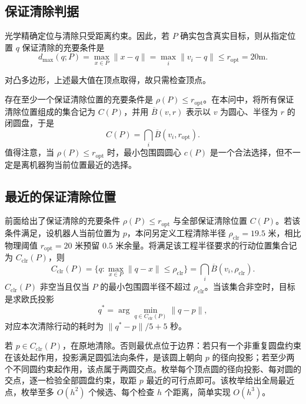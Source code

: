 \documentclass[UTF8,a4paper,zihao=-4,fontset=none]{ctexart}
\begin{document}
\subsection{保证清除判据}

光学精确定位与清除只受距离约束。因此，若 \(P\) 确实包含真实目标，则从指定位置 \(q\) 保证清除的充要条件是
\begin{equation}
  d_{\max}(q;P)=\max_{x\in P}\lVert x-q\rVert=\max_i\lVert v_i-q\rVert\le r_{\mathrm{opt}} =20\mathrm{m}.
  \label{eq:clear-condition}
\end{equation}

对凸多边形，上述最大值在顶点取得，故只需检查顶点。

存在至少一个保证清除位置的充要条件是 \(\rho(P)\le r_{\mathrm{opt}}\)。在本问中，将所有保证清除位置组成的集合记为 \(C(P)\)，并用 \(\overline B(v,r)\) 表示以 \(v\) 为圆心、半径为 \(r\) 的闭圆盘，于是
\begin{equation}
  C(P)=\bigcap_i\overline{B}(v_i,r_{\mathrm{opt}}).
  \label{eq:clear-set}
\end{equation}
值得注意，当 \(\rho(P)\le r_{\mathrm{opt}}\) 时，最小包围圆圆心 \(c(P)\) 是一个合法选择，但不一定是离机器狗当前位置最近的选择。

\subsection{最近的保证清除位置}

前面给出了保证清除的充要条件 \(\rho(P)\le r_{\mathrm{opt}}\) 与全部保证清除位置 \(C(P)\)。若该条件满足，设机器人当前位置为 \(p\)，本问另定义工程清除半径 \(\rho_{\mathrm{clr}}=19.5\) 米，相比物理阈值 \(r_{\mathrm{opt}}=20\) 米预留 \(0.5\) 米余量。将满足该工程半径要求的行动位置集合记为 \(C_{\mathrm{clr}}(P)\)，则
\begin{equation}
  C_{\mathrm{clr}}(P)=\{q:\max_{x\in P}\lVert q-x\rVert\le\rho_{\mathrm{clr}}\}
  =\bigcap_{i}\overline{B}(v_i,\rho_{\mathrm{clr}}).
  \label{eq:clear-proj}
\end{equation}
\(C_{\mathrm{clr}}(P)\) 非空当且仅当 \(P\) 的最小包围圆半径不超过 \(\rho_{\mathrm{clr}}\)。当该集合非空时，目标是求欧氏投影
\begin{equation}
  q^*=\arg\min_{q\in C_{\mathrm{clr}}(P)}\lVert q-p\rVert ,
\end{equation}
对应本次清除行动的耗时为 \(\lVert q^*-p\rVert/5+5\) 秒。

若 \(p\in C_{\mathrm{clr}}(P)\)，在原地清除。否则最优点位于边界：若只有一个非重复圆盘约束在该处起作用，投影满足圆弧法向条件，是该圆上朝向 \(p\) 的径向投影；若至少两个不同圆约束起作用，该点属于两圆交点。枚举每个顶点圆的径向投影、每对圆的交点，逐一检验全部圆盘约束，取距 \(p\) 最近的可行点即可。该枚举给出全局最近点，枚举至多 \(O(h^2)\) 个候选、每个检查 \(h\) 个距离，简单实现 \(O(h^3)\)。
\end{document}

